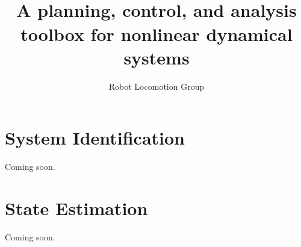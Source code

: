 \documentclass{book}
\title{{\Huge \drake}\\ {\huge A planning, control, and
    analysis toolbox for nonlinear dynamical systems}}
\author{\Large Robot Locomotion Group}
\begin{document}
\maketitle

\tableofcontents 













\chapter{System Identification}

Coming soon.

\chapter{State Estimation}

Coming soon.






\appendix







\end{document}

